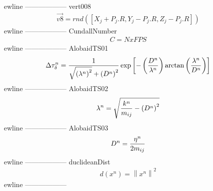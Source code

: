 ewline
------------------
\newline
vert008\newline
\begin{equation*}
 \begin{split}
 \vec{v8}=rnd([X_j+P_j.R,Y_j-P_j.R,Z_j-P_j.R])\end{split}
 \end{equation*}
ewline
------------------
\newline
CundallNumber\newline
\begin{equation*}
 \begin{split}
 C = NxFPS\end{split}
 \end{equation*}
ewline
------------------
\newline
AlobaidTS01\newline
\begin{equation*}
 \begin{split}
 \Delta \tau _\delta ^n = {1 \over {\sqrt {{{({\lambda ^n})}^2}}  + {{({D^n})}^2}}}\exp \left[ { - \left( {{{{D^n}} \over {{\lambda ^n}}}} \right)\arctan \left( {{{{\lambda ^n}} \over {{D^n}}}} \right)} \right]\end{split}
 \end{equation*}
ewline
------------------
\newline
AlobaidTS02\newline
\begin{equation*}
 \begin{split}
 {\lambda ^n} = \sqrt {{{{k^n}} \over {{m_{ij}}}} - {{\left( {{D^n}} \right)}^2}}\end{split}
 \end{equation*}
ewline
------------------
\newline
AlobaidTS03\newline
\begin{equation*}
 \begin{split}
 {D^n} = {{{\eta ^n}} \over {2{m_{ij}}}}\end{split}
 \end{equation*}
ewline
------------------
\newline
duclideanDist\newline
\begin{equation*}
 \begin{split}
 d\left( {{x^n}} \right) = {\left\| {{x^n}} \right\|^2}\end{split}
 \end{equation*}
ewline
------------------
